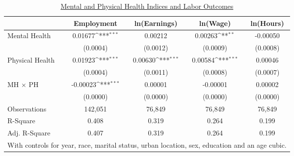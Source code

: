 \def\sym#1{\ifmmode^{#1}\else\(^{#1}\)\fi}
\begin{table}
\center\caption*{\large{\underline{Mental and Physical Health Indices and Labor Outcomes}}}
\vspace{0.2cm}
\begin{tabular}{l*{4}{c}}
                    &\multicolumn{1}{c}{Employment}&\multicolumn{1}{c}{ln(Earnings)}&\multicolumn{1}{c}{ln(Wage)}&\multicolumn{1}{c}{ln(Hours)}\\
\midrule
Mental Health       &     0.01677\sym{***}&     0.00212         &     0.00263\sym{**} &    -0.00050         \\
                    &    (0.0004)         &    (0.0012)         &    (0.0009)         &    (0.0008)         \\
Physical Health     &     0.01923\sym{***}&     0.00630\sym{***}&     0.00584\sym{***}&     0.00046         \\
                    &    (0.0004)         &    (0.0011)         &    (0.0008)         &    (0.0007)         \\
MH $\times$ PH      &    -0.00023\sym{***}&     0.00001         &    -0.00001         &     0.00002         \\
                    &    (0.0000)         &    (0.0000)         &    (0.0000)         &    (0.0000)         \\
\midrule
Observations        &      142,051         &       76,849         &       76,849         &       76,849         \\
R-Square            &       0.408         &       0.319         &       0.264         &       0.199         \\
Adj. R-Square       &       0.407         &       0.319         &       0.264         &       0.199         \\
\bottomrule
\multicolumn{5}{l}{\scriptsize{With controls for year, race, marital status, urban location, sex, education and an age cubic.}} \\
\end{tabular}
\end{table}
